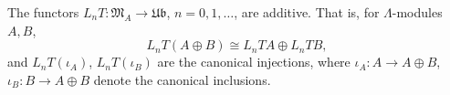 The functors $L_n T : \mathfrak{M}_A \rightarrow \mathfrak{Ub}$, $n = 0, 1, \ldots$, are additive. That is, for $\Lambda$-modules $A, B$,
$$L_n T(A \oplus B) \cong L_n TA \oplus L_n TB,$$
and $L_n T(\iota_A)$, $L_n T(\iota_B)$ are the canonical injections, where $\iota_A : A \rightarrow A \oplus B$, $\iota_B : B \rightarrow A \oplus B$ denote the canonical inclusions.
